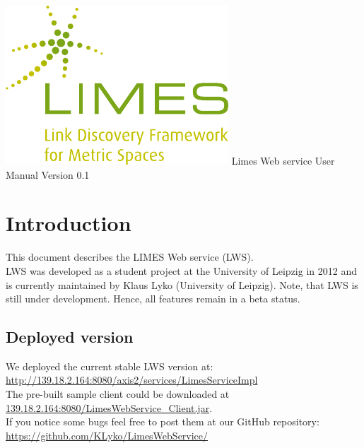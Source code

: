 \documentclass{article}
\begin{document}
\begin{titlepage}
	\begin{center}
		\includegraphics[width=\textwidth]{images/limes_logo.pdf}
		\centering
		\huge Limes Web service User Manual
		\huge Version 0.1	
		\vfill
	\end{center}
\end{titlepage}
\tableofcontents
\newpage
\section{Introduction}
This document describes the LIMES Web service (LWS).\\
LWS was developed as a student project at the University of Leipzig in 2012 and is currently maintained by Klaus Lyko (University of Leipzig). 
Note, that LWS is still under development. Hence, all features remain in a beta status.

\subsection{Deployed version}
We deployed the current stable LWS version at: \url{http://139.18.2.164:8080/axis2/services/LimesServiceImpl} \\
The pre-built sample client could be downloaded at \url{139.18.2.164:8080/LimesWebService_Client.jar}.\\
If you notice some bugs feel free to post them at our GitHub repository: \url{https://github.com/KLyko/LimesWebService/}
\end{document}
